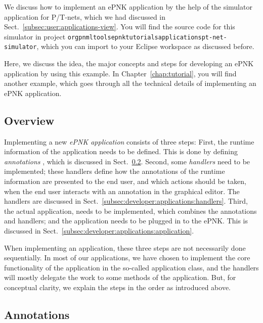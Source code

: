 We discuss how to implement an ePNK application by the help of the
simulator application for P/T-nets, which we had discussed in
Sect.~\ref{subsec:user:applications-view}.  You will find the
source code for this simulator in project
{\tt org\qnsep{}pnml\qnsep{}tools\qnsep{}epnk\qnsep{}tutorials\qnsep{}applications\qnsep{}pt-net-simulator},
which you can import to your Eclipse workspace as discussed before.

Here, we discuss the idea, the major concepts and steps for developing an
ePNK application by using this example. In Chapter~\ref{chap:tutorial},
you will find another example, which goes through all the technical
details of implementing an ePNK application.

\subsection{Overview}
\label{subsec:developer:applications:overview}

Implementing a new \emph{ePNK application} consists of three steps: First,
the runtime information of the application needs to be defined. This is
done by defining \emph{annotations}%
, which is discussed in
Sect.~\ref{subsec:developer:applications:annotations}. Second, some \emph{handlers}
need to be implemented; these handlers define how the annotations of the
runtime information are presented to the end user, and which actions should
be taken, when the end user interacts with an annotation in the graphical
editor. The handlers
are discussed in Sect.~\ref{subsec:developer:applications:handlers}. 
Third, the actual application, needs to be implemented, which combines
the annotations and handlers; and the application needs to be plugged in
to the ePNK. This is discussed in
Sect.~\ref{subsec:developer:applications:application}. 

When implementing an application, these three steps are not necessarily
done sequentially. In most of our applications, we have chosen to implement
the core functionality of the application in the so-called application
class, and the handlers will mostly delegate the work to some methods
of the application. But, for conceptual clarity, we explain the steps
in the order as introduced above.

\subsection{Annotations}
\label{subsec:developer:applications:annotations}

